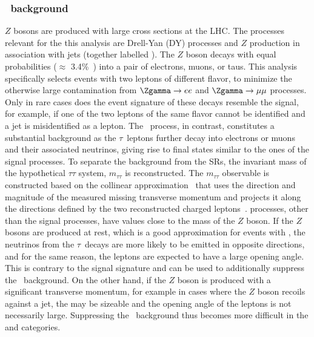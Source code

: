 \subsubsection{\Ztautau\ background}
$Z$ bosons are produced with large cross sections at the LHC. The processes relevant for the this analysis are Drell-Yan (DY) processes and $Z$ production in association with jets (together labelled \Zgamma).
The $Z$ boson decays with equal probabilities ($\approx$ 3.4\%~\cite{PDG2020}) into a pair of electrons, muons, or taus. 
This analysis specifically selects events with two leptons of different flavor, to minimize the otherwise large contamination from $\Zgamma \to ee$ and $\Zgamma \to \mu\mu$ processes. 
Only in rare cases does the event signature of these decays resemble the signal, for example, if one of the two leptons of the same flavor cannot be identified and a jet is misidentified as a lepton.
The \Ztautau\ process, in contrast, constitutes a substantial background as the $\tau$~leptons further decay into electrons or muons and their associated neutrinos, giving rise to final states similar to the ones of the signal processes. 
To separate the \Ztautau background from the SRs, the invariant mass of the hypothetical $\tau\tau$ system, $m_{\tau\tau}$ is reconstructed.
The $m_{\tau\tau}$ observable is constructed based on the collinear approximation~\cite{Plehn:1999xi} that uses the direction and magnitude of the measured missing transverse momentum and projects it along the directions defined by the two reconstructed charged leptons~\cite{HWWPaper}.
\Zgamma processes, other than the signal processes, have \mtt values close to the mass of the $Z$ boson.
If the $Z$ bosons are produced at rest, which is a good approximation for events with \ZeroJet, the neutrinos from the $\tau$~decays are more likely to be emitted in opposite directions, and for the same reason, the leptons are expected to have a large opening angle. This is contrary to the signal signature and can be used to additionally suppress the \Ztautau\ background.
On the other hand, if the $Z$ boson is produced with a significant transverse momentum, for example in cases where the $Z$ boson recoils against a jet, the \MET may be sizeable and the opening angle of the leptons is not necessarily large. 
Suppressing the \Ztautau\ background thus becomes more difficult in the \OneJet and \TwoJet categories. 


